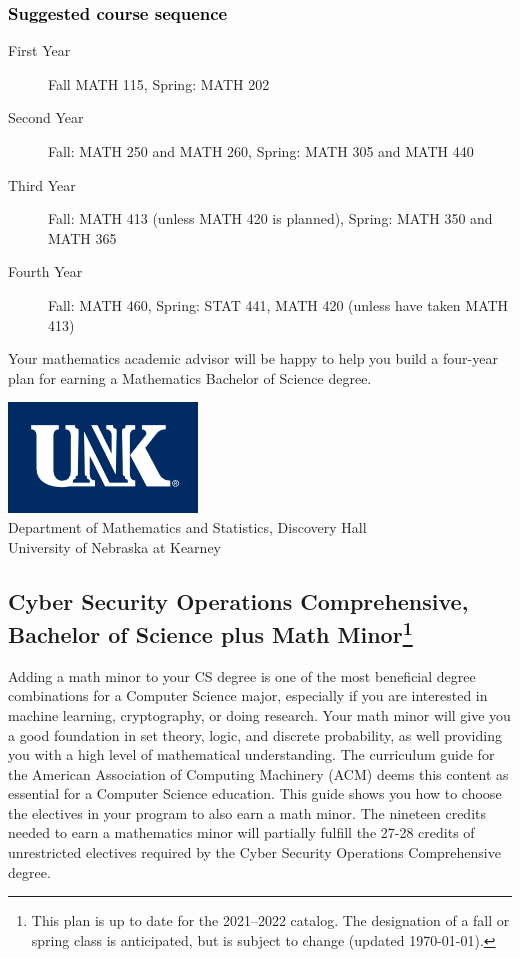 \documentclass[10pt]{article}
\newenvironment{mypar}[2]
   {\begin{list}{}%
     {\setlength\leftmargin{#1}
     \setlength\rightmargin{#2}}
     \item[]}
   {\end{list}}
\newcommand{\catalog}{2021--2022 }
\newcommand{\myfootnote}{\footnote{This plan is up to date for  the \catalog catalog. The designation of a fall or spring class is 
anticipated, but  is subject to change (updated  \today).}}
\newcommand{\myheading}{
\begin{flushleft}
\includegraphics[scale=0.35]{unk-logo}\\
\setcounter{footnote}{0}
\vspace{0.25in}
 \textcolor{unkblue}{Department of Mathematics and Statistics, Discovery Hall} \\
  \textcolor{unkblue}{University of Nebraska at Kearney}
\end{flushleft}}
\begin{document}
\subsubsection*{\textcolor{black}{Suggested course sequence}}

\begin{description}
   \item[\phantom{xxx} First  Year] Fall MATH 115, Spring: MATH 202
      \item[\phantom{xxx} Second Year]  Fall: MATH 250 and MATH 260,   Spring: MATH 305 and MATH 440
     \item[\phantom{xxx} Third  Year]  Fall: MATH 413 (unless MATH 420 is planned),  Spring: MATH 350 and MATH 365
      \item[\phantom{xxx} Fourth Year]  Fall: MATH 460,  Spring: STAT 441, MATH 420 (unless have taken MATH 413)
 \end{description}

\begin{mypar}{0.5cm}{0.5cm}  Your mathematics academic advisor will be happy to help you build a four-year plan for earning a Mathematics Bachelor of Science degree. \end{mypar}
\newpage



\myheading

\subsection*{\textbf{\textcolor{unkblue}{Cyber Security Operations Comprehensive, Bachelor of Science plus Math Minor\myfootnote}}}

Adding a math minor to your CS degree is one of the most beneficial degree combinations for a Computer Science major, especially if you are interested in machine learning, cryptography,  or doing research.  Your math minor will give you a good foundation in set theory, logic, and discrete probability, as well providing you with a high level of mathematical understanding. The curriculum guide for the American Association of Computing Machinery (ACM) deems  this content  as essential for  a Computer Science education. This guide shows you how to choose the electives in your program to also earn a math minor. The nineteen  credits needed to earn a mathematics minor will partially fulfill the 27-28  credits of unrestricted electives required by the 
Cyber Security Operations Comprehensive degree.
\end{document}
